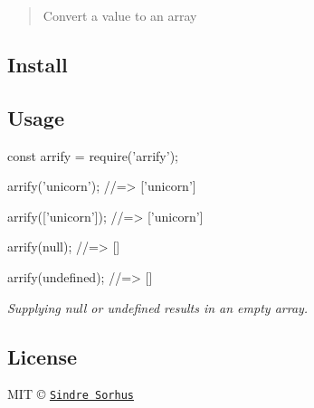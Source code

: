 \begin{quote}
Convert a value to an array \end{quote}


\subsection*{Install}




\subsection*{Usage}


\begin{DoxyCode}
const arrify = require('arrify');

arrify('unicorn');
//=> ['unicorn']

arrify(['unicorn']);
//=> ['unicorn']

arrify(null);
//=> []

arrify(undefined);
//=> []
\end{DoxyCode}


{\itshape Supplying {\ttfamily null} or {\ttfamily undefined} results in an empty array.}

\subsection*{License}

M\+IT © \href{http://sindresorhus.com}{\tt Sindre Sorhus} 